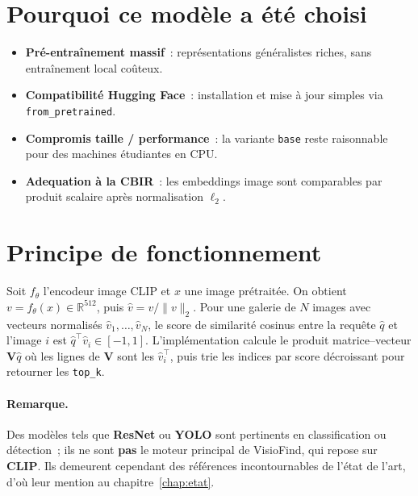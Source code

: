\documentclass[11pt,a4paper,openany]{report}
\begin{document}
\section{Pourquoi ce modèle a été choisi}

\begin{itemize}[leftmargin=*]
  \item \textbf{Pré-entraînement massif}~: représentations généralistes riches, sans entraînement local coûteux.
  \item \textbf{Compatibilité Hugging Face}~: installation et mise à jour simples via \texttt{from\_pretrained}.
  \item \textbf{Compromis taille / performance}~: la variante \texttt{base} reste raisonnable pour des machines étudiantes en CPU.
  \item \textbf{Adequation à la CBIR}~: les embeddings image sont comparables par produit scalaire après normalisation $\ell_2$.
\end{itemize}

\section{Principe de fonctionnement}

Soit $f_\theta$ l'encodeur image CLIP et $x$ une image prétraitée. On obtient $v = f_\theta(x) \in \mathbb{R}^{512}$, puis $\hat{v} = v / \|v\|_2$. Pour une galerie de $N$ images avec vecteurs normalisés $\hat{v}_1,\ldots,\hat{v}_N$, le score de similarité cosinus entre la requête $\hat{q}$ et l'image $i$ est $\hat{q}^\top \hat{v}_i \in [-1,1]$. L'implémentation calcule le produit matrice–vecteur $\mathbf{V}\hat{q}$ où les lignes de $\mathbf{V}$ sont les $\hat{v}_i^\top$, puis trie les indices par score décroissant pour retourner les \texttt{top\_k}.

\paragraph{Remarque.} Des modèles tels que \textbf{ResNet} ou \textbf{YOLO} sont pertinents en classification ou détection~; ils ne sont \textbf{pas} le moteur principal de VisioFind, qui repose sur \textbf{CLIP}. Ils demeurent cependant des références incontournables de l'état de l'art, d'où leur mention au chapitre~\ref{chap:etat}.

\end{document}
